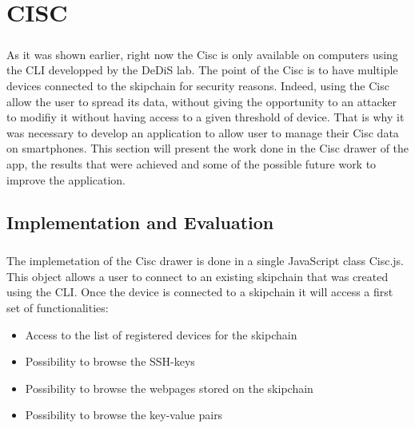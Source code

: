 \chapter{CISC}

\paragraph{}
As it was shown earlier, right now the Cisc is only available on computers using the CLI developped by the DeDiS lab. The point of the Cisc is to have multiple devices connected to the skipchain for security reasons. Indeed, using the Cisc allow the user to spread its data, without giving the opportunity to an attacker to modifiy it without having access to a given threshold of device. That is why it was necessary to develop an application to allow user to manage their Cisc data on smartphones. This section will present the work done in the Cisc drawer of the app, the results that were achieved and some of the possible future work to improve the application.

\section{Implementation and Evaluation}

\paragraph{}
The implemetation of the Cisc drawer is done in a single JavaScript class Cisc.js. This object allows a user to connect to an existing skipchain that was created using the CLI. Once the device is connected to a skipchain it will access a first set of functionalities:
\begin{itemize}
  \item Access to the list of registered devices for the skipchain
  \item Possibility to browse the SSH-keys
  \item Possibility to browse the webpages stored on the skipchain
  \item Possibility to browse the key-value pairs
\end{itemize}

